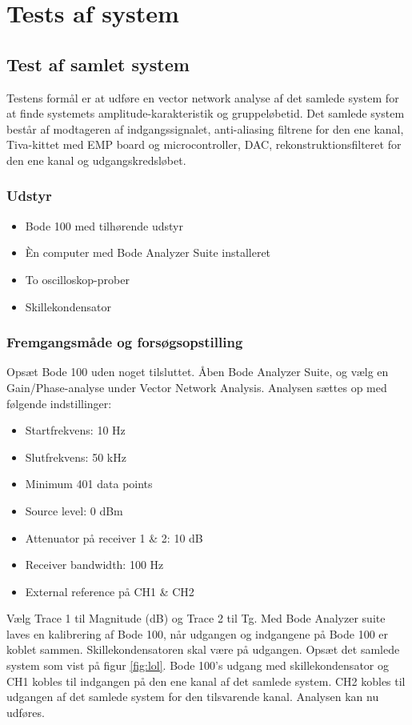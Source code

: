 \chapter{Tests af system}
\label{bilag:test}
\section{Test af samlet system}
\label{sec:test_samlet}
Testens formål er at udføre en vector network analyse af det samlede system for at finde systemets amplitude-karakteristik og gruppeløbetid. 
Det samlede system består af modtageren af indgangssignalet, anti-aliasing filtrene for den ene kanal, Tiva-kittet med EMP board og microcontroller, DAC, rekonstruktionsfilteret for den ene kanal og udgangskredsløbet. 

\subsection{Udstyr}
\begin{itemize}
	\item Bode 100 med tilhørende udstyr
	\item Èn computer med Bode Analyzer Suite installeret
	\item To oscilloskop-prober
	\item Skillekondensator
\end{itemize}

\subsection{Fremgangsmåde og forsøgsopstilling}
Opsæt Bode 100 uden noget tilsluttet. 
Åben Bode Analyzer Suite, og vælg en Gain/Phase-analyse under Vector Network Analysis. 
Analysen sættes op med følgende indstillinger:
\begin{multicols}{2}
\begin{itemize}
	\item Startfrekvens: 10 Hz
	\item Slutfrekvens: 50 kHz
	\item Minimum 401 data points
	\item Source level: 0 dBm
	\item Attenuator på receiver 1 \& 2: 10 dB
	\item Receiver bandwidth: 100 Hz
	\item External reference på CH1 \& CH2
\end{itemize}
\end{multicols}
Vælg Trace 1 til Magnitude (dB) og Trace 2 til Tg. \newline
Med Bode Analyzer suite laves en kalibrering af Bode 100, når udgangen og indgangene på Bode 100 er koblet sammen. 
Skillekondensatoren skal være på udgangen. \newline
Opsæt det samlede system som vist på figur \ref{fig:lol}. 
Bode 100's udgang med skillekondensator og CH1 kobles til indgangen på den ene kanal af det samlede system. 
CH2 kobles til udgangen af det samlede system for den tilsvarende kanal. 
Analysen kan nu udføres. 

